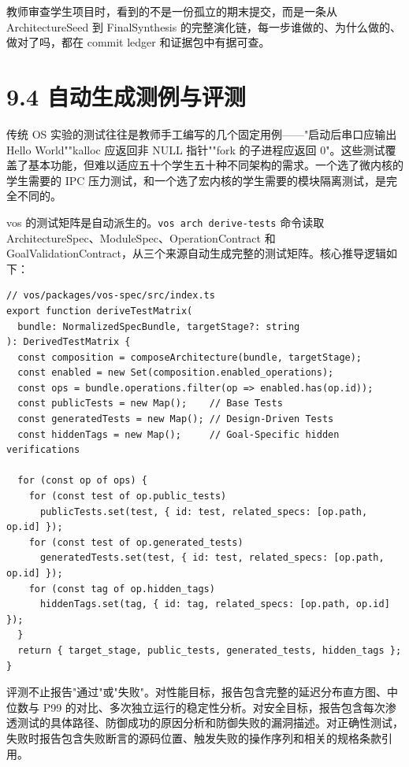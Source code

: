 \documentclass[UTF8,a4paper,12pt,openany]{ctexrep}
\newcommand{\passthrough}[1]{#1}
\begin{document}
教师审查学生项目时，看到的不是一份孤立的期末提交，而是一条从 ArchitectureSeed 到 FinalSynthesis 的完整演化链，每一步谁做的、为什么做的、做对了吗，都在 commit ledger 和证据包中有据可查。

\section{9.4 自动生成测例与评测}\label{94-ux81eaux52a8ux751fux6210ux6d4bux4f8bux4e0eux8bc4ux6d4b}

传统 OS 实验的测试往往是教师手工编写的几个固定用例------"启动后串口应输出 Hello World""kalloc 应返回非 NULL 指针""fork 的子进程应返回 0"。这些测试覆盖了基本功能，但难以适应五十个学生五十种不同架构的需求。一个选了微内核的学生需要的 IPC 压力测试，和一个选了宏内核的学生需要的模块隔离测试，是完全不同的。

vos 的测试矩阵是自动派生的。\passthrough{\lstinline!vos arch derive-tests!} 命令读取 ArchitectureSpec、ModuleSpec、OperationContract 和 GoalValidationContract，从三个来源自动生成完整的测试矩阵。核心推导逻辑如下：

\begin{lstlisting}
// vos/packages/vos-spec/src/index.ts
export function deriveTestMatrix(
  bundle: NormalizedSpecBundle, targetStage?: string
): DerivedTestMatrix {
  const composition = composeArchitecture(bundle, targetStage);
  const enabled = new Set(composition.enabled_operations);
  const ops = bundle.operations.filter(op => enabled.has(op.id));
  const publicTests = new Map();    // Base Tests
  const generatedTests = new Map(); // Design-Driven Tests
  const hiddenTags = new Map();     // Goal-Specific hidden verifications

  for (const op of ops) {
    for (const test of op.public_tests)
      publicTests.set(test, { id: test, related_specs: [op.path, op.id] });
    for (const test of op.generated_tests)
      generatedTests.set(test, { id: test, related_specs: [op.path, op.id] });
    for (const tag of op.hidden_tags)
      hiddenTags.set(tag, { id: tag, related_specs: [op.path, op.id] });
  }
  return { target_stage, public_tests, generated_tests, hidden_tags };
}
\end{lstlisting}

评测不止报告"通过"或"失败"。对性能目标，报告包含完整的延迟分布直方图、中位数与 P99 的对比、多次独立运行的稳定性分析。对安全目标，报告包含每次渗透测试的具体路径、防御成功的原因分析和防御失败的漏洞描述。对正确性测试，失败时报告包含失败断言的源码位置、触发失败的操作序列和相关的规格条款引用。
\end{document}
